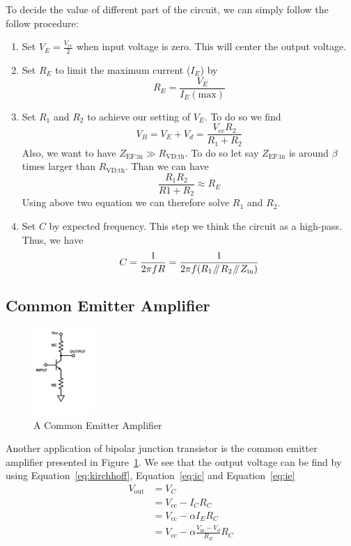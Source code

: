\documentclass[aps,prl,reprint]{revtex4-1}
\newcommand{\vcc}{V_\text{cc}}
\newcommand{\parallelsum}{\mathbin{\!/\mkern-5mu/\!}}
\begin{document}
To decide the value of different part of the circuit, we can simply follow the follow procedure:
\begin{enumerate}
    \item Set $V_E = \frac{\vcc}{2}$ when input voltage is zero. This will center the output voltage.

    \item Set $R_E$ to limit the maximum current ($I_E$) by 
    \[
    R_E = \frac{V_E}{I_E(\text{max})}
    \]

    \item Set $R_1$ and $R_2$ to achieve our setting of $V_E$. To do so we find 
    \[
    V_B = V_E + V_d = \frac{\vcc R_2}{R_1 + R_2}
    \]
    Also, we want to have $Z_\text{EF:in}\gg R_\text{VD:th}$. To do so let say $Z_\text{EF:in}$ is around $\beta$ times larger than $R_\text{VD:th}$. Than we can have 
    \[
    \frac{R_1R_2}{R1+R_2} \approx R_E
    \]
    Using above two equation we can therefore solve $R_1$ and $R_2$.

    \item Set $C$ by expected frequency. This step we think the circuit as a high-pass. Thus, we have 
    \[
    C = \frac{1}{2\pi f R} = \frac{1}{2\pi f (R_1 \parallelsum R_2 \parallelsum Z_\text{in})}
    \]
\end{enumerate}

\subsection{Common Emitter Amplifier}
\begin{figure}[h]
    \centering
    \includegraphics[height=1.3in]{image/Common-Emitter-Amplifier.pdf}
    \caption{A Common Emitter Amplifier}
    \label{fig:amplifier}
\end{figure}
Another application of bipolar junction transistor is the common emitter amplifier presented in Figure~\ref{fig:amplifier}. We see that the output voltage can be find by using Equation~\ref{eq:kirchhoff}, Equation~\ref{eq:ic} and Equation~\ref{eq:ie}
\begin{align*}
    V_\text{out} &= V_C \\
                 &= \vcc -I_CR_C \\
                 &= \vcc -\alpha I_E R_C\\
                 &= \vcc - \alpha \frac{V_\text{in} - V_d}{R_E}R_C
\end{align*}
\end{document}
